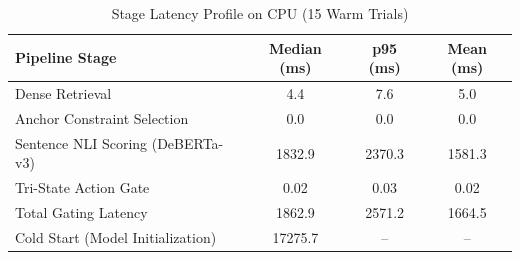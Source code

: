 \begin{table}[h]
\centering
\caption{Stage Latency Profile on CPU (15 Warm Trials)}
\label{tab:latency}
\begin{tabular}{lccc}
\toprule
\textbf{Pipeline Stage} & \textbf{Median (ms)} & \textbf{p95 (ms)} & \textbf{Mean (ms)} \\
\midrule
Dense Retrieval & 4.4 & 7.6 & 5.0 \\
Anchor Constraint Selection & 0.0 & 0.0 & 0.0 \\
Sentence NLI Scoring (DeBERTa-v3) & 1832.9 & 2370.3 & 1581.3 \\
Tri-State Action Gate & 0.02 & 0.03 & 0.02 \\
Total Gating Latency & 1862.9 & 2571.2 & 1664.5 \\
Cold Start (Model Initialization) & 17275.7 & -- & -- \\
\bottomrule
\end{tabular}
\end{table}